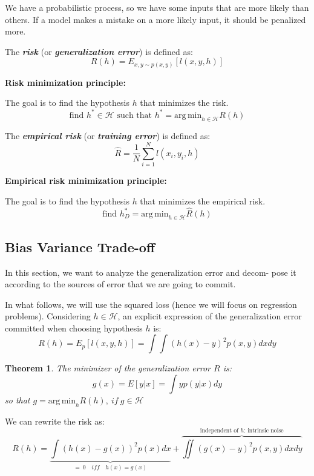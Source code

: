 We have a probabilistic process, so we have some inputs that are more likely than others. If a model makes a mistake on a more likely input, it should be penalized more.

\begin{definitionblock}[Risk]
The \textbf{\textit{risk}} (or \textbf{\textit{generalization error}}) is defined as:
$$
R(h) = E_{x,y \sim p(x,y)}[l(x,y,h)]
$$ 
\end{definitionblock}

\textbf{Risk minimization principle:}

The goal is to find the hypothesis $h$ that minimizes the risk.
$$
\text{find } h^* \in \mathcal{H} \text{ such that } h^* = \mathrm{arg\,min}_{h \in \mathcal{H}} R(h)
$$

\begin{definitionblock}
The \textbf{\textit{empirical risk}} (or \textbf{\textit{training error}}) is defined as:
$$
\hat R = \dfrac 1N \sum_{i=1}^N l(x_i, y_i, h)
$$
\end{definitionblock}


\textbf{Empirical risk minimization principle:}

The goal is to find the hypothesis $h$ that minimizes the empirical risk.
$$
\text{find } h^*_D = \mathrm{arg\,min}_{h \in \mathcal{H}} \hat R(h)
$$

\subsection{Bias Variance Trade-off}

In this section, we want to analyze the generalization error and decom-
pose it according to the sources of error that we are going to commit.

In what follows, we will use the squared loss (hence we will focus on
regression problems). Considering $h \in \mathcal H$, an explicit expression of the generalization error committed when choosing hypothesis $h$ is:
$$
R(h) = E_p[l(x,y,h)] = \int \int (h(x) - y)^2 p(x,y) dx dy
$$

\newtheorem{theorem}{Theorem}
\begin{theorem}
    The minimizer of the generalization error $R$ is:
    $$
    \boxed{ g(x) = E[y|x] = \int y p(y|x) dy }
    $$
    so that $g = \mathrm{arg\,min}_h R(h),\ if\ g \in \mathcal H$
\end{theorem}

We can rewrite the risk as:
$$
R(h) = \underbrace{\int (h(x) - g(x))^2 p(x) dx}_{=\ 0 \quad iff \quad h(x) = g(x)} + \overbrace{\iint (g(x) - y)^2 p(x,y) dx dy}^{\text{independent of }h \text{: intrinsic noise}}
$$



